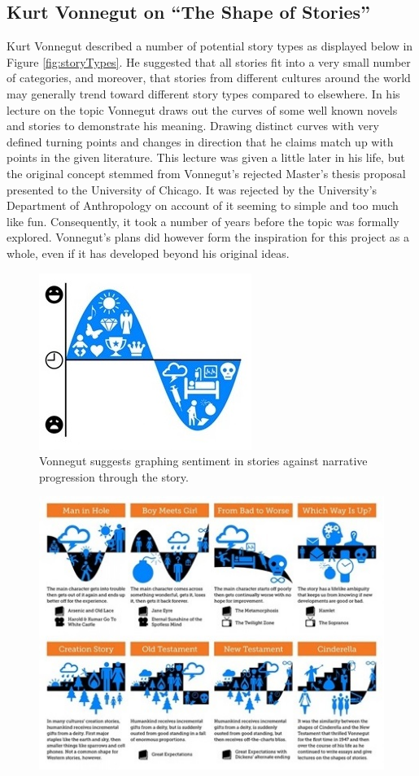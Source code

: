 \documentclass{article}
\begin{document}
{    \subsection{Kurt Vonnegut on ``The Shape of Stories''}
        Kurt Vonnegut described a number of potential story types as displayed below in Figure \ref{fig:storyTypes}. He suggested that all stories fit into a very small number of categories, and moreover, that stories from different cultures around the world may generally trend toward different story types compared to elsewhere. In his lecture on the topic \citep{vonnegutLecture} Vonnegut draws out the curves of some well known novels and stories to demonstrate his meaning. Drawing distinct curves with very defined turning points and changes in direction that he claims match up with points in the given literature. This lecture was given a little later in his life, but the original concept stemmed from Vonnegut's rejected Master's thesis proposal presented to the University of Chicago. It was rejected by the University's Department of Anthropology on account of it seeming to simple and too much like fun. Consequently, it took a number of years before the topic was formally explored. Vonnegut's plans did however form the inspiration for this project as a whole, even if it has developed beyond his original ideas.
        \begin{figure}[htbp]
            \centering
            \includegraphics{Figures/Misc/sentimentGraph}
            \caption{Vonnegut suggests graphing sentiment in stories against narrative progression through the story.}
            \label{fig:sentiGraph}
        \end{figure}
        \begin{figure}[htbp]
            \centering
            \includegraphics{Figures/Misc/VonnegutShapes}

\end{figure}}
\end{document}
